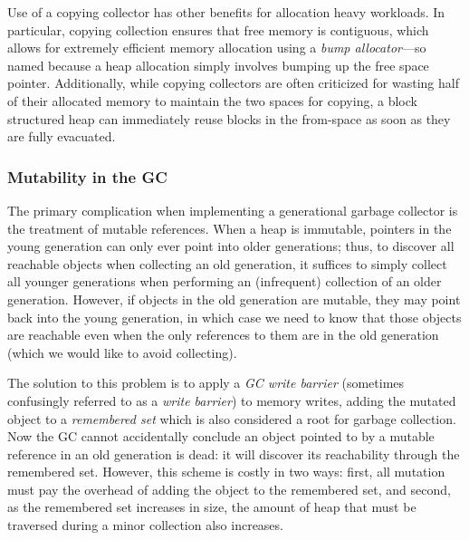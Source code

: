 Use of a copying collector has other benefits for allocation heavy
workloads.  In particular, copying collection ensures that free memory
is contiguous, which allows for extremely efficient memory allocation
using a \emph{bump allocator}---so named because a heap allocation
simply involves bumping up the free space pointer. Additionally, while
copying collectors are often criticized for wasting half of their
allocated memory to maintain the two spaces for copying, a block
structured heap can immediately reuse blocks in the from-space as soon
as they are fully evacuated. 

\subsubsection{Mutability in the GC}

The primary complication when implementing a generational garbage
collector is the treatment of mutable references.  When a heap is
immutable, pointers in the young generation can only ever point into
older generations; thus, to discover all reachable objects when
collecting an old generation, it suffices to simply collect all younger
generations when performing an (infrequent) collection of an older
generation.  However, if objects in the old generation are mutable, they
may point back into the young generation, in which case we need to know
that those objects are reachable even when the only references to them
are in the old generation (which we would like to avoid collecting).

The solution to this problem is to apply a \emph{GC write barrier}
(sometimes confusingly referred to as a \emph{write barrier}) to memory
writes, adding the mutated object to a \emph{remembered set} which is
also considered a root for garbage collection.  Now the GC cannot
accidentally conclude an object pointed to by a mutable reference in an
old generation is dead: it will discover its reachability through the
remembered set.  However, this scheme is costly in two ways: first, all
mutation must pay the overhead of adding the object to the remembered
set, and second, as the remembered set increases in size, the amount of
heap that must be traversed during a minor collection also increases.

